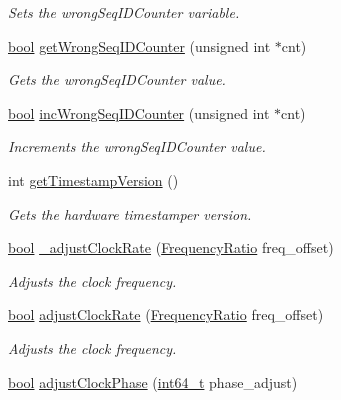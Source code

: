 \begin{DoxyCompactItemize}
\begin{DoxyCompactList}\small\item\em Sets the wrong\+Seq\+I\+D\+Counter variable. \end{DoxyCompactList}\item 
\hyperlink{avb__gptp_8h_af6a258d8f3ee5206d682d799316314b1}{bool} \hyperlink{class_common_port_a78d1e5daea050c83aeef01a7b9a640ea}{get\+Wrong\+Seq\+I\+D\+Counter} (unsigned int $\ast$cnt)
\begin{DoxyCompactList}\small\item\em Gets the wrong\+Seq\+I\+D\+Counter value. \end{DoxyCompactList}\item 
\hyperlink{avb__gptp_8h_af6a258d8f3ee5206d682d799316314b1}{bool} \hyperlink{class_common_port_a1f75bd2d9889160f75d54aae507312be}{inc\+Wrong\+Seq\+I\+D\+Counter} (unsigned int $\ast$cnt)
\begin{DoxyCompactList}\small\item\em Increments the wrong\+Seq\+I\+D\+Counter value. \end{DoxyCompactList}\item 
int \hyperlink{class_common_port_a37b73927973c0156148f290f57141db9}{get\+Timestamp\+Version} ()
\begin{DoxyCompactList}\small\item\em Gets the hardware timestamper version. \end{DoxyCompactList}\item 
\hyperlink{avb__gptp_8h_af6a258d8f3ee5206d682d799316314b1}{bool} \hyperlink{class_common_port_a3e1572a1780c20a1dabaa7fe63982a9f}{\+\_\+adjust\+Clock\+Rate} (\hyperlink{ptptypes_8hpp_a84de47dc2ed889ecd2b61706d3ad0f2e}{Frequency\+Ratio} freq\+\_\+offset)
\begin{DoxyCompactList}\small\item\em Adjusts the clock frequency. \end{DoxyCompactList}\item 
\hyperlink{avb__gptp_8h_af6a258d8f3ee5206d682d799316314b1}{bool} \hyperlink{class_common_port_ae170579ddceaecf5aadccb4a34f86d63}{adjust\+Clock\+Rate} (\hyperlink{ptptypes_8hpp_a84de47dc2ed889ecd2b61706d3ad0f2e}{Frequency\+Ratio} freq\+\_\+offset)
\begin{DoxyCompactList}\small\item\em Adjusts the clock frequency. \end{DoxyCompactList}\item 
\hyperlink{avb__gptp_8h_af6a258d8f3ee5206d682d799316314b1}{bool} \hyperlink{class_common_port_a02450dd64ba11f034faefad018d15a63}{adjust\+Clock\+Phase} (\hyperlink{parse_8c_a67a9885ef4908cb72ce26d75b694386c}{int64\+\_\+t} phase\+\_\+adjust)

\end{DoxyCompactItemize}
